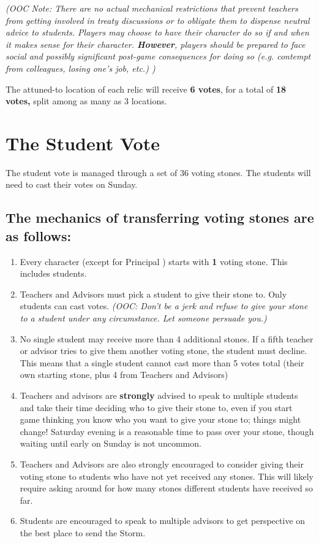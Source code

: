 \documentclass[green]{GL2020}
\begin{document}
\emph{(OOC Note: There are no actual mechanical restrictions that prevent teachers from getting involved in treaty discussions or to obligate them to dispense neutral advice to students. Players may choose to have their character do so if and when it makes sense for their character. \textbf{However}, players should be prepared to face social and possibly significant post-game consequences for doing so (e.g. contempt from colleagues, losing one's job, etc.) )}

The attuned-to location of each relic will receive \textbf{6 votes}, for a total of \textbf{18 votes,} split among as many as 3 locations. 

\section*{The Student Vote}
The student vote is managed through a set of 36 voting stones. The students will need to cast their votes on Sunday.

\subsection*{The mechanics of transferring voting stones are as follows:}

\begin{enumerate}
\item Every character (except for Principal \cPrincipal{}) starts with \textbf{1} voting stone. This includes students.
\item Teachers and Advisors must pick a student to give their stone to. Only students can cast votes. \emph{(OOC: Don't be a jerk and refuse to give your stone to a student under any circumstance. Let someone persuade you.)}
\item No single student may receive more than 4 additional stones. If a fifth teacher or advisor tries to give them another voting stone, the student must decline. This means that a single student cannot cast more than 5 votes total (their own starting stone, plus 4 from Teachers and Advisors)
\item Teachers and advisors are \textbf{strongly} advised to speak to multiple students and take their time deciding who to give their stone to, even if you start game thinking you know who you want to give your stone to; things might change! Saturday evening is a reasonable time to pass over your stone, though waiting until early on Sunday is not uncommon. 
\item Teachers and Advisors are also strongly encouraged to consider giving their voting stone to students who have not yet received any stones. This will likely require asking around for how many stones different students have received so far.
\item Students are encouraged to speak to multiple advisors to get perspective on the best place to send the Storm.
\end{enumerate}
\end{document}

